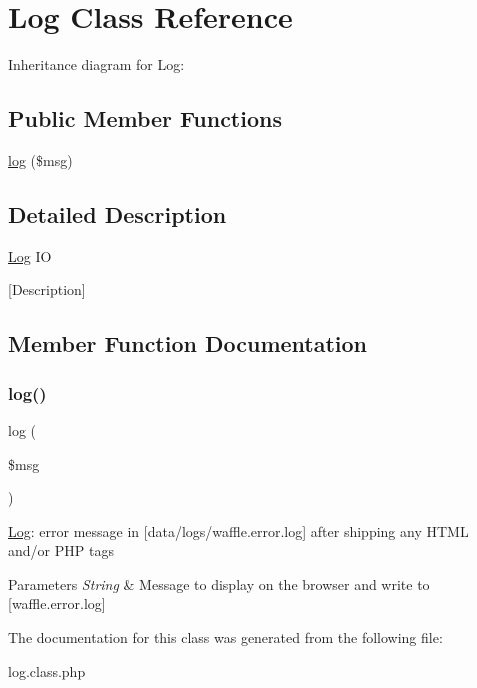 \hypertarget{class_w_a_f_f_l_e_1_1_framework_1_1_i_o_1_1_log}{}\section{Log Class Reference}
\label{class_w_a_f_f_l_e_1_1_framework_1_1_i_o_1_1_log}


Inheritance diagram for Log\+:
\subsection*{Public Member Functions}
\begin{DoxyCompactItemize}
\item 
\hyperlink{class_w_a_f_f_l_e_1_1_framework_1_1_i_o_1_1_log_a3e3c415ada57f553ac4a39a40051c94f}{log} (\$msg)
\end{DoxyCompactItemize}


\subsection{Detailed Description}
\hyperlink{class_w_a_f_f_l_e_1_1_framework_1_1_i_o_1_1_log}{Log} IO

\mbox{[}Description\mbox{]} 

\subsection{Member Function Documentation}
\mbox{\label{class_w_a_f_f_l_e_1_1_framework_1_1_i_o_1_1_log_a3e3c415ada57f553ac4a39a40051c94f}} 
\subsubsection{\texorpdfstring{log()}{log()}}
{\footnotesize\ttfamily log (\begin{DoxyParamCaption}\item[{}]{\$msg }\end{DoxyParamCaption})}

\hyperlink{class_w_a_f_f_l_e_1_1_framework_1_1_i_o_1_1_log}{Log}\+: error message in \mbox{[}data/logs/waffle.\+error.\+log\mbox{]} after shipping any H\+T\+ML and/or P\+HP tags


\begin{DoxyParams}{Parameters}
{\em String} & Message to display on the browser and write to \mbox{[}waffle.\+error.\+log\mbox{]} \\
\hline
\end{DoxyParams}


The documentation for this class was generated from the following file\+:\begin{DoxyCompactItemize}
\item 
log.\+class.\+php\end{DoxyCompactItemize}
